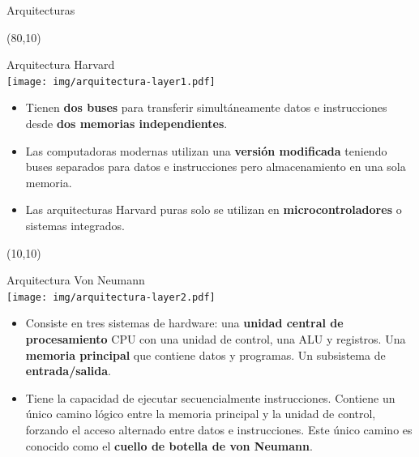 \documentclass[aspectratio=169]{beamer}
\begin{document}
\begin{frame}[fragile,t]{Arquitecturas}
    \begin{textblock}{65}(80,10)
    \begin{center}
    Arquitectura Harvard\\
    \vspace{0.2cm}
    \texttt{[image: img/arquitectura-layer1.pdf]}
    \end{center}
    \begin{itemize}
    \scriptsize
    \item Tienen \textbf{dos buses} para transferir simultáneamente datos e instrucciones desde \textbf{dos memorias independientes}.
    \item Las computadoras modernas utilizan una \textbf{versión modificada} teniendo buses separados para datos e instrucciones pero almacenamiento en una sola memoria.
    \item Las arquitecturas Harvard puras solo se utilizan en \textbf{microcontroladores} o sistemas integrados.
    \end{itemize}
    \end{textblock}
    \begin{textblock}{65}(10,10)
    \begin{center}
    Arquitectura Von Neumann\\
    \vspace{0.2cm}
    \texttt{[image: img/arquitectura-layer2.pdf]} 
    \end{center}
    \begin{itemize}
    \scriptsize
    \item Consiste en tres sistemas de hardware: una \textbf{unidad central de procesamiento} CPU con una unidad de control, una ALU y registros. Una \textbf{memoria principal} que contiene datos y programas. Un subsistema de \textbf{entrada/salida}.
    \item Tiene la capacidad de ejecutar secuencialmente instrucciones. Contiene un único camino lógico entre la memoria principal y la unidad de control, forzando el acceso alternado entre datos e instrucciones. Este único camino es conocido como el \textbf{cuello de botella de von Neumann}.
    \end{itemize}
    \end{textblock}
\end{frame}

\end{document}
